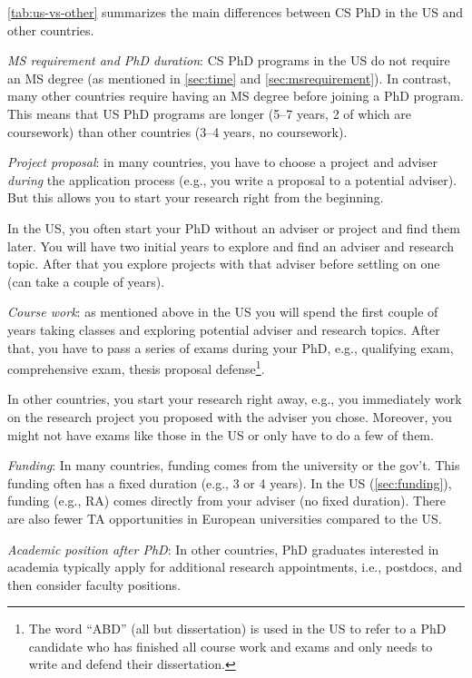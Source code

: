 \documentclass[oneside,11pt,dvipsnames]{book}
\begin{document}
\autoref{tab:us-vs-other} summarizes the main differences between CS PhD in the US and other countries. %

\emph{MS requirement and PhD duration}:  CS PhD programs in the US do not require an MS degree (as mentioned in \autoref{sec:time} and \autoref{sec:msrequirement}).  In contrast, many other countries require having an MS degree before joining a PhD program.  This means that US PhD programs are longer (5--7 years, 2 of which are coursework) than other countries (3--4 years, no coursework).

\emph{Project proposal}: in many countries, you have to choose a project and adviser \emph{during} the application process (e.g., you write a proposal to a potential adviser). But this allows you to start your research right from the beginning. 

In the US, you often start your PhD without an adviser or project and find them later. You will have two initial years to explore and find an adviser and research topic. After that you explore projects with that adviser before settling on one (can take a couple of years). 

\emph{Course work}: as mentioned above in the US you will spend the first couple of years taking classes and exploring potential adviser and research topics. 
After that, you have to pass a series of exams during your PhD, e.g., qualifying exam, comprehensive exam, thesis proposal defense\footnote{The word ``ABD'' (all but dissertation) is used in the US to refer to a PhD candidate who has finished all course work and exams and only needs to write and defend their dissertation.}.

In other countries, you start your research right away, e.g., you immediately work on the research project you proposed with the adviser you chose. Moreover, you might not have exams like those in the US or only have to do a few of them.

\emph{Funding}:  In many countries, funding comes from the university or the gov't. This funding often has a fixed duration (e.g., 3 or 4 years).  In the US (\autoref{sec:funding}), funding (e.g., RA) comes directly from your adviser (no fixed duration).  There are also fewer TA opportunities in European universities compared to the US.

\emph{Academic position after PhD}: In other countries, PhD graduates interested in academia typically apply for additional research appointments, i.e., postdocs, and then consider faculty positions. 
\end{document}
